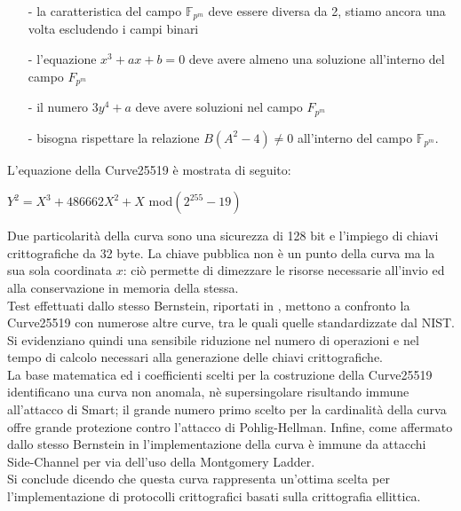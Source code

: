 \documentclass[a4paper,12pt]{tesiinfo}
\begin{document}
\begin{itemize}
      \item[-] la caratteristica del campo $\mathbb{F}_{p^m}$ deve essere diversa da 2, stiamo ancora una volta escludendo i campi binari
      \item[-] l'equazione $x^3+ax+b=0$ deve avere almeno una soluzione all'interno del campo $F_{p^m}$
      \item[-] il numero $3y^4+a$ deve avere soluzioni nel campo $F_{p^m}$
      \item[-] bisogna rispettare la relazione $B(A^2-4) \ne 0$ all'interno del campo $\mathbb{F}_{p^m}$.
\end{itemize}
L'equazione della Curve25519 \`e mostrata di seguito:
\begin{center}
$Y^2=X^3+486662X^2+X$ mod$(2^{255}-19)$
\end{center}
Due particolarit\`a della curva sono una sicurezza di 128 bit e l'impiego di chiavi crittografiche da 32 byte. La chiave pubblica non \`e un punto della curva ma la sua sola coordinata $x$: ci\`o permette di dimezzare le risorse necessarie all'invio ed alla conservazione in memoria della stessa. 
\\
Test effettuati dallo stesso Bernstein, riportati in \cite{curve25519 fast, speed table}, mettono a confronto la Curve25519 con numerose altre curve, tra le quali quelle standardizzate dal NIST. Si evidenziano quindi una sensibile riduzione nel numero di operazioni e nel tempo di calcolo necessari alla generazione delle chiavi crittografiche. 
\\
La base matematica ed i coefficienti scelti per la costruzione della Curve25519 identificano una curva non anomala, n\`e supersingolare risultando immune all'attacco di Smart; il grande numero primo scelto per la cardinalit\`a della curva offre grande protezione contro l'attacco di Pohlig-Hellman. Infine, come affermato dallo stesso Bernstein in \cite{curve25519 fast} l'implementazione della curva \cite{impl 25519} \`e immune da attacchi Side-Channel per via dell'uso della Montgomery Ladder.
\\
Si conclude dicendo che questa curva rappresenta un'ottima scelta per l'implementazione di protocolli crittografici basati sulla crittografia ellittica.
%
%
%
%
%
%
%
%
%
%
\end{document}
